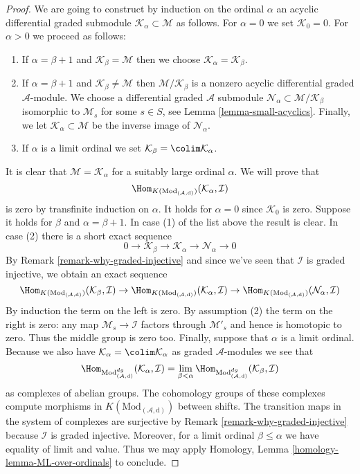 \begin{proof}
\medskip\noindent
We are going to construct by induction on the ordinal $\alpha$
an acyclic differential graded submodule
$\mathcal{K}_\alpha \subset \mathcal{M}$ as follows.
For $\alpha = 0$ we set $\mathcal{K}_0 = 0$. For $\alpha > 0$
we proceed as follows:
\begin{enumerate}
\item If $\alpha = \beta + 1$ and $\mathcal{K}_\beta = \mathcal{M}$
then we choose $\mathcal{K}_\alpha = \mathcal{K}_\beta$.
\item If $\alpha = \beta + 1$ and $\mathcal{K}_\beta \not = \mathcal{M}$
then $\mathcal{M}/\mathcal{K}_\beta$ is a nonzero acyclic
differential graded $\mathcal{A}$-module.
We choose a differential graded $\mathcal{A}$ submodule
$\mathcal{N}_\alpha \subset \mathcal{M}/\mathcal{K}_\beta$
isomorphic to $\mathcal{M}_s$ for some $s \in S$, see
Lemma \ref{lemma-small-acyclics}.
Finally, we let $\mathcal{K}_\alpha \subset \mathcal{M}$
be the inverse image of $\mathcal{N}_\alpha$.
\item If $\alpha$ is a limit ordinal we set
$\mathcal{K}_\beta = \colim \mathcal{K}_\alpha$.
\end{enumerate}
It is clear that $\mathcal{M} = \mathcal{K}_\alpha$ for a suitably large
ordinal $\alpha$. We will prove that
$$
\Hom_{K(\text{Mod}_{(\mathcal{A}, \text{d})})}(\mathcal{K}_\alpha, \mathcal{I})
$$
is zero by transfinite induction on $\alpha$. It holds for $\alpha = 0$
since $\mathcal{K}_0$ is zero. Suppose it holds for $\beta$ and
$\alpha = \beta + 1$. In case (1) of the list above the result is clear.
In case (2) there is a short exact sequence
$$
0 \to \mathcal{K}_\beta \to \mathcal{K}_\alpha \to \mathcal{N}_\alpha \to 0
$$
By Remark \ref{remark-why-graded-injective}
and since we've seen that $\mathcal{I}$ is graded
injective, we obtain an exact sequence
$$
\Hom_{K(\text{Mod}_{(\mathcal{A}, \text{d})})}(\mathcal{K}_\beta, \mathcal{I})
\to
\Hom_{K(\text{Mod}_{(\mathcal{A}, \text{d})})}(\mathcal{K}_\alpha, \mathcal{I})
\to
\Hom_{K(\text{Mod}_{(\mathcal{A}, \text{d})})}(\mathcal{N}_\alpha, \mathcal{I})
$$
By induction the term on the left is zero. By assumption (2)
the term on the right is zero: any map $\mathcal{M}_s \to \mathcal{I}$
factors through $\mathcal{M}'_s$ and hence is homotopic to zero.
Thus the middle group is zero too. Finally, suppose that $\alpha$ is a
limit ordinal. Because we also have
$\mathcal{K}_\alpha = \colim \mathcal{K}_\alpha$ as graded
$\mathcal{A}$-modules we see that
$$
\Hom_{\text{Mod}^{dg}_{(\mathcal{A}, \text{d})}}
(\mathcal{K}_\alpha, \mathcal{I})
= \lim_{\beta < \alpha}
\Hom_{\text{Mod}^{dg}_{(\mathcal{A}, \text{d})}}
(\mathcal{K}_\beta, \mathcal{I})
$$
as complexes of abelian groups. The cohomology groups of these
complexes compute morphisms in $K(\text{Mod}_{(\mathcal{A}, \text{d})})$
between shifts. The transition maps in the system of complexes
are surjective by Remark \ref{remark-why-graded-injective}
because $\mathcal{I}$ is graded injective.
Moreover, for a limit ordinal $\beta \leq \alpha$
we have equality of limit and value. Thus we may apply
Homology, Lemma \ref{homology-lemma-ML-over-ordinals}
to conclude.
\end{proof}

